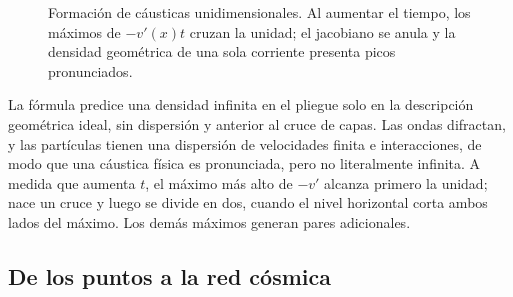 \begin{figure}[htbp]\centering
\begin{coursefitfigure}\end{coursefitfigure}\caption{Formación de cáusticas unidimensionales. Al aumentar el tiempo, los máximos de \(-v'(x)t\) cruzan la unidad; el jacobiano se anula y la densidad geométrica de una sola corriente presenta picos pronunciados.}\label{fig:c09-caustic-1d}\end{figure}

La fórmula predice una densidad infinita en el pliegue solo en la descripción geométrica ideal, sin dispersión y anterior al cruce de capas. Las ondas difractan, y las partículas tienen una dispersión de velocidades finita e interacciones, de modo que una cáustica física es pronunciada, pero no literalmente infinita. A medida que aumenta \(t\), el máximo más alto de \(-v'\) alcanza primero la unidad; nace un cruce y luego se divide en dos, cuando el nivel horizontal corta ambos lados del máximo. Los demás máximos generan pares adicionales.

\subsection{De los puntos a la red cósmica}

